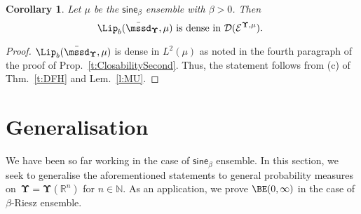 \documentclass[11pt,letterpaper]{amsart}
\newcommand{\dom}[1]{\mathcal D(#1)}
\newcommand{\sem}[1]{\{#1\}_{t \ge 0}}
\let\temp\phi
\let\phi\varphi
\let\varphi\temp
\newcommand{\N}{{\mathbb N}}
\newcommand{\R}{{\mathbb R}}
\newcommand{\comma}{\,\,\mathrm{,}\;\,}
\newcommand{\purple}[1]{{\color{purple}#1}}
\newcommand{\QP}{{\mu}}
\newcommand{\dUpsilon}{{\mathbf \Upsilon}}
\newcommand{\U}{\dUpsilon}
\newcommand{\sine}{\mathsf{sine}}
\newcommand{\E}{\mathcal E}
\renewcommand{\1}{\mathbf 1}
\numberwithin{equation}{section}
\theoremstyle{plain}
\newtheorem{cor}[thm]{Corollary}%
\theoremstyle{definition}
\theoremstyle{remark}
\begin{document}
\begin{cor} \label{cor:DLA}
Let $\QP$ be the $\sine_\beta$ ensemble with $\beta>0$. Then
$$\text{$\Lip_b(\bar{\mssd}_\U, \QP)$ is dense in $\dom{\E^{\U, \QP}}$. }$$
\end{cor}
\begin{proof}
$\Lip_b(\bar{\mssd}_\U, \QP)$ is dense in $L^2(\QP)$ as noted in the fourth paragraph of the proof of Prop.~\ref{t:ClosabilitySecond}. Thus, the statement follows from (c) of Thm.~\ref{t:DFH} and Lem.~\ref{l:MU}.
\end{proof}
\section{Generalisation} \label{sec:GL}
We have been so far working in the case of $\sine_\beta$ ensemble. In this section, we seek to generalise the aforementioned statements to general probability measures on~$\U=\U(\R^n)$ for $n \in \N$. As an application, we prove $\BE(0,\infty)$ in the case of $\beta$-Riesz ensemble. 
\smallskip
\end{document}
